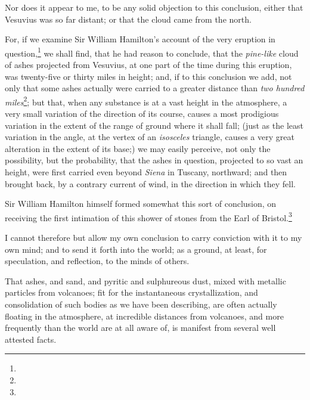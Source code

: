 \documentclass[a4paper, 12pt, oneside, twocolumn]{article}
\begin{document}
Nor does it appear to me, to be any solid objection to this conclusion, either that Vesuvius was so far distant; or that the cloud came from the north.

For, if we examine Sir William Hamilton's account of the very eruption in question,\footnote{} we shall find, that he had reason to conclude, that the \emph{pine-like} cloud of ashes projected from Vesuvius, at one part of the time during this eruption, was twenty-five or thirty miles in height; and, if to this conclusion we add, not only that some ashes actually were carried to a greater distance than \emph{two hundred miles}\footnote{}; but that, when any substance is at a vast height in the atmosphere, a very small variation of the direction of its course, causes a most prodigious variation in the extent of the range of ground where it shall fall; (just as the least variation in the angle, at the vertex of an \emph{isosceles} triangle, causes a very great alteration in the extent of its base;) we may easily perceive, not only the possibility, but the probability, that the ashes in question, projected to so vast an height, were first carried even beyond \emph{Siena} in Tuscany, northward; and then brought back, by a contrary current of wind, in the direction in which they fell.

Sir William Hamilton himself formed somewhat this sort of conclusion, on receiving the first intimation of this shower of stones from the Earl of Bristol.\footnote{}

I cannot therefore but allow my own conclusion to carry conviction with it to my own mind; and to send it forth into the world; as a ground, at least, for speculation, and reflection, to the minds of others.

That ashes, and sand, and pyritic and sulphureous dust, mixed with metallic particles from volcanoes; fit for the instantaneous crystallization, and consolidation of such bodies as we have been describing, are often actually floating in the atmosphere, at incredible distances from volcanoes, and more frequently than the world are at all aware of, is manifest from several well attested facts.
\end{document}
